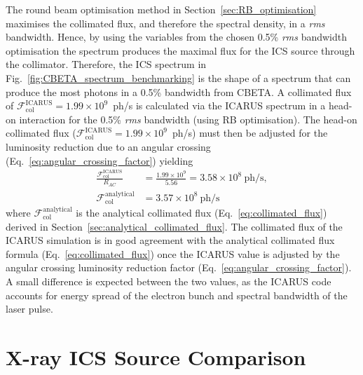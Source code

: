 \documentclass[../main.tex]{subfiles}
\begin{document}
The round beam optimisation method in Section~\ref{sec:RB_optimisation} maximises the collimated flux, and therefore the spectral density, in a \textit{rms} bandwidth. Hence, by using the variables from the chosen 0.5\% \textit{rms} bandwidth optimisation the spectrum produces the maximal flux for the ICS source through the collimator. Therefore, the ICS spectrum in Fig.~\ref{fig:CBETA_spectrum_benchmarking} is the shape of a spectrum that can produce the most photons in a 0.5\% bandwidth from CBETA. A collimated flux of $\mathcal{F}^{\mathrm{ICARUS}}_{\mathrm{col}}=1.99\times 10^{9}$~ph/\si{\second} is calculated via the \textsc{ICARUS} spectrum in a head-on interaction for the 0.5\% \textit{rms} bandwidth (using RB optimisation). The head-on collimated flux ($\mathcal{F}^{\mathrm{ICARUS}}_{\mathrm{col}}=1.99\times 10^{9}$~ph/\si{\second}) must then be adjusted for the luminosity reduction due to an angular crossing (Eq.~\ref{eq:angular_crossing_factor}) yielding 
\begin{align*}
\frac{\mathcal{F}_{\mathrm{col}}^{\mathrm{ICARUS}}}{R_{AC}} &= \frac{1.99\times 10^{9}}{5.56} = 3.58\times 10^{8}~\mathrm{ph/\si{\second}}, \\
\mathcal{F}_{\mathrm{col}}^{\mathrm{analytical}} &= 3.57\times 10^{8}~\mathrm{ph/\si{\second}}
\label{eq:CBETA_ICARUS_yield}    
\end{align*}
where $\mathcal{F}_{\mathrm{col}}^{\mathrm{analytical}}$ is the analytical collimated flux (Eq.~\ref{eq:collimated_flux}) derived in Section~\ref{sec:analytical_collimated_flux}. The collimated flux of the \textsc{ICARUS} simulation is in good agreement with the analytical collimated flux formula (Eq.~\ref{eq:collimated_flux}) once the \textsc{ICARUS} value is adjusted by the angular crossing luminosity reduction factor (Eq.~\ref{eq:angular_crossing_factor}). A small difference is expected between the two values, as the ICARUS code accounts for energy spread of the electron bunch and spectral bandwidth of the laser pulse.

\section{X-ray ICS Source Comparison}
\label{sec:xray_ICS_comparison}
\end{document}
